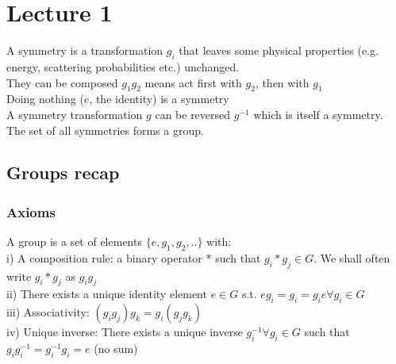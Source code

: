 \documentclass{article}
\begin{document}
\section{Lecture 1}
A symmetry is a transformation $g_i$ that leaves some physical properties (e.g. energy, scattering probabilities etc.) unchanged.\\
They can be composed $g_1g_2$ means act first with $g_2$, then with $g_1$\\
Doing nothing ($e$, the identity) is a symmetry\\
A symmetry transformation $g$ can be reversed $g^{-1}$ which is itself a symmetry.\\
The set of all symmetries forms a group. 
\subsection{Groups recap}
\subsubsection{Axioms}
A group is a set of elements $\{e,g_1,g_2,..\}$ with:\\
i) A composition rule: a binary operator * such that $g_i * g_j \in G$. We shall often write $g_i * g_j$ as $g_ig_j$\\
ii) There exists a unique identity element $e\in G$ s.t. $eg_i=g_i=g_ie \forall g_i \in G$\\
iii) Associativity: $(g_ig_j)g_k  = g_i(g_jg_k)$\\
iv) Unique inverse: There exists a unique inverse $g_i^{-1} \forall g_i \in G$ such that $g_ig_i^{-1} = g_i^{-1}g_i = e$ (no sum)
\end{document}
